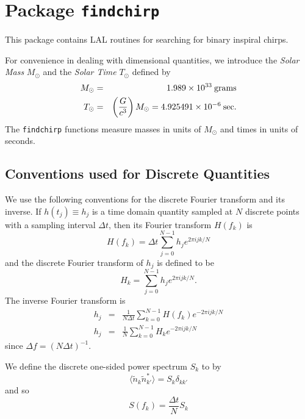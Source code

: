 \chapter{Package \texttt{findchirp}}

This package contains LAL routines for searching for binary inspiral chirps.

For convenience in dealing with dimensional quantities, we introduce
the {\it Solar Mass} $M_\odot$ and the {\it Solar Time} $T_\odot$
defined by
\begin{eqnarray}
M_\odot &=& 1.989 \times 10^{33} \> {\rm grams}\\
T_\odot &=& \left( {G \over c^3} \right) M_\odot = 4.925491 \times
10^{-6} \> {\rm sec}.
\end{eqnarray}
The \verb|findchirp| functions measure masses in units of $M_\odot$ 
and times in units of seconds.

\section{Conventions used for Discrete Quantities}

We use the following conventions for the discrete Fourier transform and 
its inverse. If $h(t_j) \equiv h_j$ is a time domain quantity sampled at
$N$ discrete points with a sampling interval $\Delta t$, then its Fourier 
transform $H(f_k)$ is
\begin{equation}
H(f_k) = \Delta t \sum_{j=0}^{N-1} h_j e^{2\pi ijk/N}
\end{equation}
and the discrete Fourier transform of $h_j$ is defined to be
\begin{equation}
H_k = \sum_{j=0}^{N-1} h_j e^{2\pi ijk/N}.
\end{equation}
The inverse Fourier transform is 
\begin{eqnarray}
\nonumber
h_j &=& \frac{1}{N\Delta t} \sum_{k=0}^{N-1} H(f_k) e^{-2\pi ijk/N} \\
h_j &=& \frac{1}{N} \sum_{k=0}^{N-1} H_k e^{-2\pi ijk/N}
\end{eqnarray}
since $\Delta f = (N\Delta t)^{-1}$.

We define the discrete one-sided power spectrum $S_k$ to by
\begin{equation}
\langle \tilde{n}_k \tilde{n}^\ast_{k'} \rangle = S_k \delta_{kk'}
\end{equation}
and so
\begin{equation}
S(f_k) = \frac{\Delta t}{N} S_k
\end{equation}


